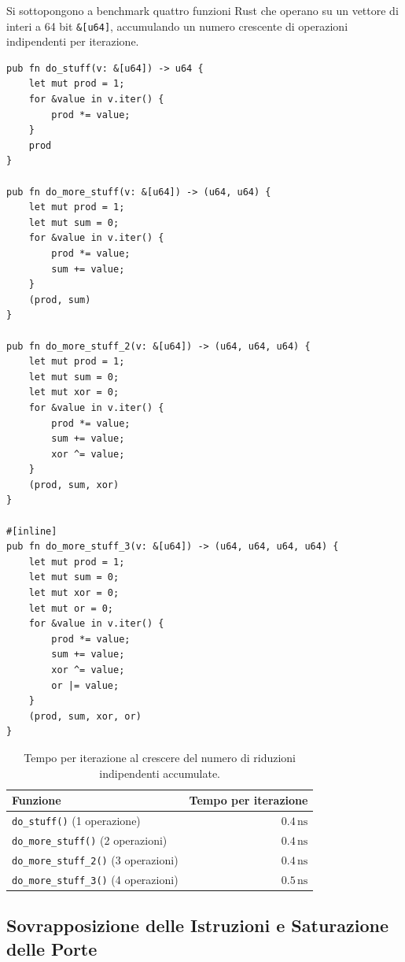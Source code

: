 Si sottopongono a benchmark quattro funzioni Rust che operano su un vettore di interi a 64 bit \texttt{\&[u64]}, accumulando un numero crescente di operazioni indipendenti per iterazione.

\begin{lstlisting}[style=rustcode,caption={Da un'unica riduzione a quattro riduzioni indipendenti per iterazione.}]
pub fn do_stuff(v: &[u64]) -> u64 {
    let mut prod = 1;
    for &value in v.iter() {
        prod *= value;
    }
    prod
}

pub fn do_more_stuff(v: &[u64]) -> (u64, u64) {
    let mut prod = 1;
    let mut sum = 0;
    for &value in v.iter() {
        prod *= value;
        sum += value;
    }
    (prod, sum)
}

pub fn do_more_stuff_2(v: &[u64]) -> (u64, u64, u64) {
    let mut prod = 1;
    let mut sum = 0;
    let mut xor = 0;
    for &value in v.iter() {
        prod *= value;
        sum += value;
        xor ^= value;
    }
    (prod, sum, xor)
}

#[inline]
pub fn do_more_stuff_3(v: &[u64]) -> (u64, u64, u64, u64) {
    let mut prod = 1;
    let mut sum = 0;
    let mut xor = 0;
    let mut or = 0;
    for &value in v.iter() {
        prod *= value;
        sum += value;
        xor ^= value;
        or |= value;
    }
    (prod, sum, xor, or)
}
\end{lstlisting}

\begin{table}[htbp]
\centering
\small
\begin{tabular}{l r}
\toprule
\textbf{Funzione} & \textbf{Tempo per iterazione} \\
\midrule
\texttt{do\_stuff()} (1 operazione) & $0.4\,\text{ns}$ \\
\texttt{do\_more\_stuff()} (2 operazioni) & $0.4\,\text{ns}$ \\
\texttt{do\_more\_stuff\_2()} (3 operazioni) & $0.4\,\text{ns}$ \\
\texttt{do\_more\_stuff\_3()} (4 operazioni) & $0.5\,\text{ns}$ \\
\bottomrule
\end{tabular}
\caption{Tempo per iterazione al crescere del numero di riduzioni indipendenti accumulate.}
\label{tab:interleaving-arithmetic}
\end{table}

\subsection{Sovrapposizione delle Istruzioni e Saturazione delle Porte}

